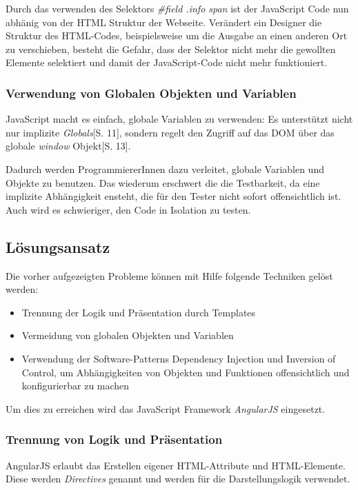\documentclass[a4paper,bibtotoc,oneside]{scrbook}
\begin{document}



Durch das verwenden des Selektors \emph{\#field .info span} ist der JavaScript Code nun abhänig von der HTML Struktur der Webseite. Verändert ein Designer  die Struktur des HTML-Codes, beispielsweise um die Ausgabe an einen anderen Ort zu verschieben, besteht die Gefahr, dass der Selektor nicht mehr die gewollten Elemente selektiert und damit der JavaScript-Code nicht mehr funktioniert.

\subsubsection{Verwendung von Globalen Objekten und Variablen}
JavaScript macht es einfach, globale Variablen zu verwenden: Es unterstützt nicht nur implizite \emph{Globals}\cite{js_patterns}[S. 11], sondern regelt den Zugriff auf das DOM über das globale \emph{window} Objekt\cite{js_patterns}[S. 13].

Dadurch werden ProgrammiererInnen dazu verleitet, globale Variablen und Objekte zu benutzen. Das wiederum erschwert die die Testbarkeit, da eine implizite Abhängigkeit ensteht, die für den Tester nicht sofort offensichtlich ist. Auch wird es schwieriger, den Code in Isolation zu testen.

\subsection{Lösungsansatz}
Die vorher aufgezeigten Probleme können mit Hilfe folgende Techniken gelöst werden:

\begin{itemize}
	\item Trennung der Logik und Präsentation durch Templates
	\item Vermeidung von globalen Objekten und Variablen
	\item Verwendung der Software-Patterns Dependency Injection und Inversion of Control, um Abhängigkeiten von Objekten und Funktionen offensichtlich und konfigurierbar zu machen
\end{itemize}

Um dies zu erreichen wird das JavaScript Framework \emph{AngularJS}\cite{angular} eingesetzt.

\subsubsection{Trennung von Logik und Präsentation}
AngularJS erlaubt das Erstellen eigener HTML-Attribute und HTML-Elemente. Diese werden \emph{Directives} genannt und werden für die Darstellungslogik verwendet.
\end{document}
